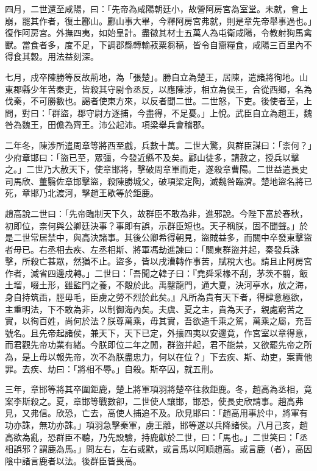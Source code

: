 \begin{pinyinscope}
四月，二世還至咸陽，曰：「先帝為咸陽朝廷小，故營阿房宮為室堂。未就，會上崩，罷其作者，復土酈山。酈山事大畢，今釋阿房宮弗就，則是章先帝舉事過也。」復作阿房宮。外撫四夷，如始皇計。盡徵其材士五萬人為屯衛咸陽，令教射狗馬禽獸。當食者多，度不足，下調郡縣轉輸菽粟芻稿，皆令自齎糧食，咸陽三百里內不得食其穀。用法益刻深。

七月，戍卒陳勝等反故荊地，為「張楚」。勝自立為楚王，居陳，遣諸將徇地。山東郡縣少年苦秦吏，皆殺其守尉令丞反，以應陳涉，相立為侯王，合從西鄉，名為伐秦，不可勝數也。謁者使東方來，以反者聞二世。二世怒，下吏。後使者至，上問，對曰：「群盜，郡守尉方逐捕，今盡得，不足憂。」上悅。武臣自立為趙王，魏咎為魏王，田儋為齊王。沛公起沛。項梁舉兵會稽郡。

二年冬，陳涉所遣周章等將西至戲，兵數十萬。二世大驚，與群臣謀曰：「柰何？」少府章邯曰：「盜已至，眾彊，今發近縣不及矣。酈山徒多，請赦之，授兵以擊之。」二世乃大赦天下，使章邯將，擊破周章軍而走，遂殺章曹陽。二世益遣長史司馬欣、董翳佐章邯擊盜，殺陳勝城父，破項梁定陶，滅魏咎臨濟。楚地盜名將已死，章邯乃北渡河，擊趙王歇等於鉅鹿。

趙高說二世曰：「先帝臨制天下久，故群臣不敢為非，進邪說。今陛下富於春秋，初即位，柰何與公卿廷決事？事即有誤，示群臣短也。天子稱朕，固不聞聲。」於是二世常居禁中，與高決諸事。其後公卿希得朝見，盜賊益多，而關中卒發東擊盜者毋已。右丞相去疾、左丞相斯、將軍馮劫進諫曰：「關東群盜并起，秦發兵誅擊，所殺亡甚眾，然猶不止。盜多，皆以戌漕轉作事苦，賦稅大也。請且止阿房宮作者，減省四邊戍轉。」二世曰：「吾聞之韓子曰：『堯舜采椽不刮，茅茨不翦，飯土塯，啜土形，雖監門之養，不觳於此。禹鑿龍門，通大夏，決河亭水，放之海，身自持筑臿，脛毋毛，臣虜之勞不烈於此矣。』凡所為貴有天下者，得肆意極欲，主重明法，下不敢為非，以制御海內矣。夫虞、夏之主，貴為天子，親處窮苦之實，以徇百姓，尚何於法？朕尊萬乘，毋其實，吾欲造千乘之駕，萬乘之屬，充吾號名。且先帝起諸侯，兼天下，天下已定，外攘四夷以安邊竟，作宮室以章得意，而君觀先帝功業有緒。今朕即位二年之閒，群盜并起，君不能禁，又欲罷先帝之所為，是上毋以報先帝，次不為朕盡忠力，何以在位？」下去疾、斯、劫吏，案責他罪。去疾、劫曰：「將相不辱。」自殺。斯卒囚，就五刑。

三年，章邯等將其卒圍鉅鹿，楚上將軍項羽將楚卒往救鉅鹿。冬，趙高為丞相，竟案李斯殺之。夏，章邯等戰數卻，二世使人讓邯，邯恐，使長史欣請事。趙高弗見，又弗信。欣恐，亡去，高使人捕追不及。欣見邯曰：「趙高用事於中，將軍有功亦誅，無功亦誅。」項羽急擊秦軍，虜王離，邯等遂以兵降諸侯。八月己亥，趙高欲為亂，恐群臣不聽，乃先設驗，持鹿獻於二世，曰：「馬也。」二世笑曰：「丞相誤邪？謂鹿為馬。」問左右，左右或默，或言馬以阿順趙高。或言鹿（者），高因陰中諸言鹿者以法。後群臣皆畏高。


\end{pinyinscope}
